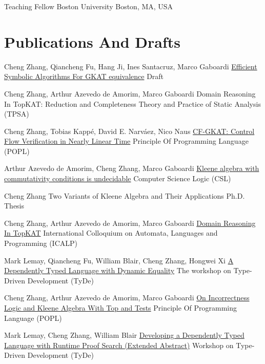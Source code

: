 \documentclass[10pt]{moderncv}        %
\let\oldsection=\section
\renewcommand{\section}{%
  \needspace{\baselineskip}
  \oldsection
}
\begin{document}
{Teaching Fellow}
{Boston University}
{Boston, MA, USA}{}
{%
}

\section{Publications And Drafts}

{Cheng Zhang, Qiancheng Fu, Hang Ji, Ines Santacruz, Marco Gaboardi}
{\href{https://github.com/qcfu-bu/rust-gkat}{Efficient Symbolic Algorithms For GKAT equivalence}}
{Draft}
{}{}

{Cheng Zhang, Arthur Azevedo de Amorim, Marco Gaboardi}
{Domain Reasoning In TopKAT: Reduction and Completeness}
{Theory and Practice of Static Analysis (TPSA)}
{}{}

{Cheng Zhang, Tobias Kappé, David E. Narváez, Nico Naus}
{\href{https://arxiv.org/abs/2411.13220}{CF-GKAT: Control Flow Verification in Nearly Linear Time}}
{Principle Of Programming Language (POPL)}
{}{}

{Arthur Azevedo de Amorim, Cheng Zhang, Marco Gaboardi}
{\href{https://hal.science/hal-04534715/}{Kleene algebra with commutativity conditions is undecidable}}
{Computer Science Logic (CSL)}
{}{}

{Cheng Zhang}
{Two Variants of Kleene Algebra and Their Applications}
{Ph.D. Thesis}
{}{}

{Cheng Zhang, Arthur Azevedo de Amorim, Marco Gaboardi}
{\href{https://arxiv.org/abs/2404.18417}{Domain Reasoning In TopKAT}}
{International Colloquium on Automata, Languages and Programming (ICALP)}
{}{}

{Mark Lemay, Qiancheng Fu, William Blair, Cheng Zhang, Hongwei Xi}
{\href{https://doi.org/10.1145/3609027.3609407}{A Dependently Typed Language with Dynamic Equality}}
{The workshop on Type-Driven Development (TyDe)}
{}{}

{Cheng Zhang, Arthur Azevedo de Amorim, Marco Gaboardi}
{\href{https://arxiv.org/abs/2108.07707}{On Incorrectness Logic and Kleene Algebra With Top and Tests}}
{Principle Of Programming Language (POPL)}
{}{}

{Mark Lemay, Cheng Zhang, William Blair}
{\href{https://icfp20.sigplan.org/details/tyde-2020-papers/7/Developing-a-Dependently-Typed-Language-with-Runtime-Proof-Search-Extended-Abstract-}
{Developing a Dependently Typed Language with Runtime Proof Search (Extended Abstract)}}
{Workshop on Type-Driven Development (TyDe)}
{}{}
\end{document}
